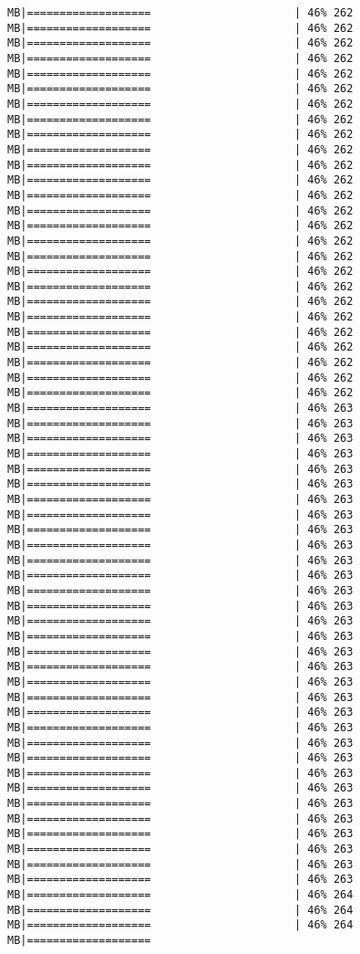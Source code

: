\documentclass[
]{article}
\begin{document}
\begin{verbatim}
MB|===================                      | 46% 262 MB|===================                      | 46% 262 MB|===================                      | 46% 262 MB|===================                      | 46% 262 MB|===================                      | 46% 262 MB|===================                      | 46% 262 MB|===================                      | 46% 262 MB|===================                      | 46% 262 MB|===================                      | 46% 262 MB|===================                      | 46% 262 MB|===================                      | 46% 262 MB|===================                      | 46% 262 MB|===================                      | 46% 262 MB|===================                      | 46% 262 MB|===================                      | 46% 262 MB|===================                      | 46% 262 MB|===================                      | 46% 262 MB|===================                      | 46% 262 MB|===================                      | 46% 262 MB|===================                      | 46% 262 MB|===================                      | 46% 262 MB|===================                      | 46% 262 MB|===================                      | 46% 262 MB|===================                      | 46% 262 MB|===================                      | 46% 262 MB|===================                      | 46% 262 MB|===================                      | 46% 263 MB|===================                      | 46% 263 MB|===================                      | 46% 263 MB|===================                      | 46% 263 MB|===================                      | 46% 263 MB|===================                      | 46% 263 MB|===================                      | 46% 263 MB|===================                      | 46% 263 MB|===================                      | 46% 263 MB|===================                      | 46% 263 MB|===================                      | 46% 263 MB|===================                      | 46% 263 MB|===================                      | 46% 263 MB|===================                      | 46% 263 MB|===================                      | 46% 263 MB|===================                      | 46% 263 MB|===================                      | 46% 263 MB|===================                      | 46% 263 MB|===================                      | 46% 263 MB|===================                      | 46% 263 MB|===================                      | 46% 263 MB|===================                      | 46% 263 MB|===================                      | 46% 263 MB|===================                      | 46% 263 MB|===================                      | 46% 263 MB|===================                      | 46% 263 MB|===================                      | 46% 263 MB|===================                      | 46% 263 MB|===================                      | 46% 263 MB|===================                      | 46% 263 MB|===================                      | 46% 263 MB|===================                      | 46% 263 MB|===================                      | 46% 264 MB|===================                      | 46% 264 MB|===================                      | 46% 264 MB|===================   
\end{verbatim}
\end{document}
